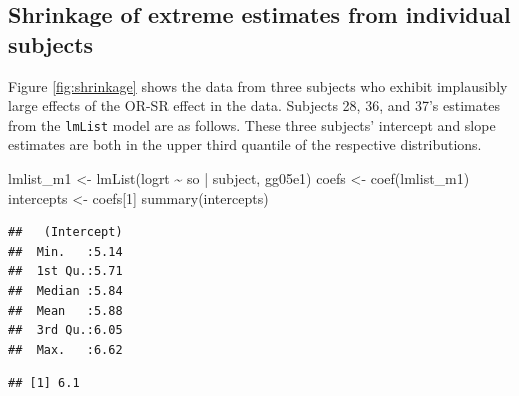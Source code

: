 \documentclass[
  12pt,
]{krantz}
\newenvironment{Shaded}{\begin{snugshade}}{\end{snugshade}}
\newcommand{\AttributeTok}[1]{\textcolor[rgb]{0.77,0.63,0.00}{#1}}
\newcommand{\DecValTok}[1]{\textcolor[rgb]{0.00,0.00,0.81}{#1}}
\newcommand{\FunctionTok}[1]{\textcolor[rgb]{0.00,0.00,0.00}{#1}}
\newcommand{\NormalTok}[1]{#1}
\newcommand{\OtherTok}[1]{\textcolor[rgb]{0.56,0.35,0.01}{#1}}
\newcommand{\SpecialCharTok}[1]{\textcolor[rgb]{0.00,0.00,0.00}{#1}}
\newcommand{\StringTok}[1]{\textcolor[rgb]{0.31,0.60,0.02}{#1}}
\theoremstyle{definition}
\theoremstyle{definition}
\theoremstyle{definition}
\theoremstyle{definition}
\theoremstyle{remark}
\begin{document}
\hypertarget{shrinkage-of-extreme-estimates-from-individual-subjects}{%
\subsection{Shrinkage of extreme estimates from individual subjects}\label{shrinkage-of-extreme-estimates-from-individual-subjects}}

Figure \ref{fig:shrinkage} shows the data from three subjects who exhibit implausibly large effects of the OR-SR effect in the data. Subjects 28, 36, and 37's estimates from the \texttt{lmList} model are as follows. These three subjects' intercept and slope estimates are both in the upper third quantile of the respective distributions.

\begin{Shaded}
\begin{Highlighting}[]
\NormalTok{lmlist\_m1 }\OtherTok{\textless{}{-}} \FunctionTok{lmList}\NormalTok{(logrt }\SpecialCharTok{\textasciitilde{}}\NormalTok{ so }\SpecialCharTok{|}\NormalTok{ subject, gg05e1)}
\NormalTok{coefs }\OtherTok{\textless{}{-}} \FunctionTok{coef}\NormalTok{(lmlist\_m1)}
\NormalTok{intercepts }\OtherTok{\textless{}{-}}\NormalTok{ coefs[}\DecValTok{1}\NormalTok{]}
\FunctionTok{summary}\NormalTok{(intercepts)}
\end{Highlighting}
\end{Shaded}

\begin{verbatim}
##   (Intercept)  
##  Min.   :5.14  
##  1st Qu.:5.71  
##  Median :5.84  
##  Mean   :5.88  
##  3rd Qu.:6.05  
##  Max.   :6.62
\end{verbatim}

\begin{Shaded}
\end{Shaded}

\begin{verbatim}
## [1] 6.1
\end{verbatim}

\begin{Shaded}
\end{Shaded}
\end{document}
